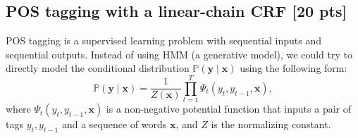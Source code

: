 \documentclass[10pt]{article}
\begin{document}
\subsection{POS tagging with a linear-chain CRF [20 pts]}
\label{sec:pos-crf}

POS tagging is a supervised learning problem with sequential inputs and sequential outputs.
Instead of using HMM (a generative model), we could try to directly model the conditional distribution $\mathbb{P}(\mathbf{y} \mid \mathbf{x})$ using the following form:
\begin{equation}
    \label{eq:general-linear-chain-crf}
    \mathbb{P}(\mathbf{y} \mid \mathbf{x}) = \frac{1}{Z(\mathbf{x})} \prod_{t=1}^{T} \Psi_t(y_t, y_{t-1}, \mathbf{x}),
\end{equation}
where $\Psi_t(y_t, y_{t-1}, \mathbf{x})$ is a non-negative potential function that inputs a pair of tags $y_t, y_{t-1}$ and a sequence of words $\mathbf{x}$, and $Z$ is the normalizing constant.
\end{document}
